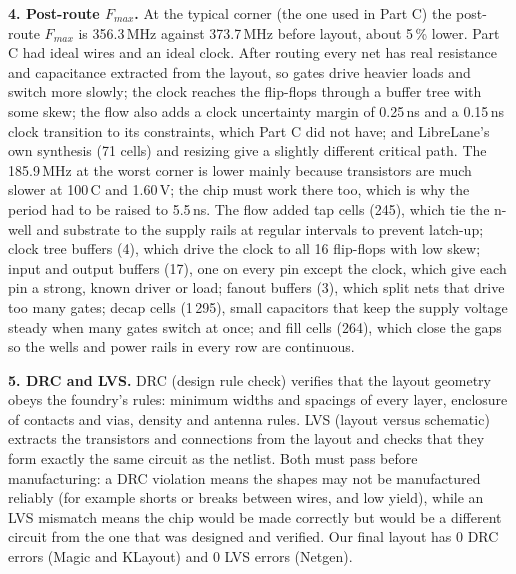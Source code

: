 \documentclass[11pt,a4paper]{article}
\begin{document}
\textbf{4. Post-route $F_{max}$.}
At the typical corner (the one used in Part C) the post-route $F_{max}$ is 356.3\,MHz against
373.7\,MHz before layout, about 5\,\% lower. Part C had ideal wires and an ideal clock. After
routing every net has real resistance and capacitance extracted from the layout, so gates drive
heavier loads and switch more slowly; the clock reaches the flip-flops through a buffer tree
with some skew; the flow also adds a clock uncertainty margin of 0.25\,ns and a 0.15\,ns clock
transition to its constraints, which Part C did not have; and LibreLane's own synthesis
(71 cells) and resizing give a slightly different critical path. The 185.9\,MHz at the worst corner is lower mainly because transistors are much
slower at 100\,\textdegree C and 1.60\,V; the chip must work there too, which is why the period
had to be raised to 5.5\,ns. The flow added tap cells (245), which tie the n-well and substrate
to the supply rails at regular intervals to prevent latch-up; clock tree buffers (4), which drive
the clock to all 16 flip-flops with low skew; input and output buffers (17), one on every pin
except the clock, which give each pin a strong, known driver or load; fanout buffers (3), which
split nets that drive too many gates; decap cells (1\,295), small capacitors that keep
the supply voltage steady when many gates switch at once; and fill cells (264), which close the
gaps so the wells and power rails in every row are continuous.

\textbf{5. DRC and LVS.}
DRC (design rule check) verifies that the layout geometry obeys the foundry's rules: minimum
widths and spacings of every layer, enclosure of contacts and vias, density and antenna rules.
LVS (layout versus schematic) extracts the transistors and connections from the layout and
checks that they form exactly the same circuit as the netlist. Both must pass before
manufacturing: a DRC violation means the shapes may not be manufactured reliably (for example
shorts or breaks between wires, and low yield), while an LVS mismatch means the chip would be
made correctly but would be a different circuit from the one that was designed and verified. Our
final layout has 0 DRC errors (Magic and KLayout) and 0 LVS errors (Netgen).
\end{document}
